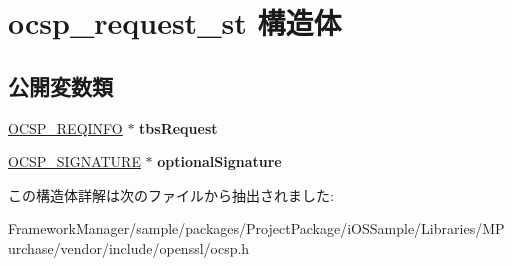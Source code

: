 \hypertarget{structocsp__request__st}{}\section{ocsp\+\_\+request\+\_\+st 構造体}
\label{structocsp__request__st}
\subsection*{公開変数類}
\begin{DoxyCompactItemize}
\item 
\hypertarget{structocsp__request__st_a743dcc34d9ff06fe9635118c0a0030c0}{}\hyperlink{structocsp__req__info__st}{O\+C\+S\+P\+\_\+\+R\+E\+Q\+I\+N\+F\+O} $\ast$ {\bfseries tbs\+Request}\label{structocsp__request__st_a743dcc34d9ff06fe9635118c0a0030c0}

\item 
\hypertarget{structocsp__request__st_a97762bfa4b2c09c1811bfe21882fce5a}{}\hyperlink{structocsp__signature__st}{O\+C\+S\+P\+\_\+\+S\+I\+G\+N\+A\+T\+U\+R\+E} $\ast$ {\bfseries optional\+Signature}\label{structocsp__request__st_a97762bfa4b2c09c1811bfe21882fce5a}

\end{DoxyCompactItemize}


この構造体詳解は次のファイルから抽出されました\+:\begin{DoxyCompactItemize}
\item 
Framework\+Manager/sample/packages/\+Project\+Package/i\+O\+S\+Sample/\+Libraries/\+M\+Purchase/vendor/include/openssl/ocsp.\+h\end{DoxyCompactItemize}
